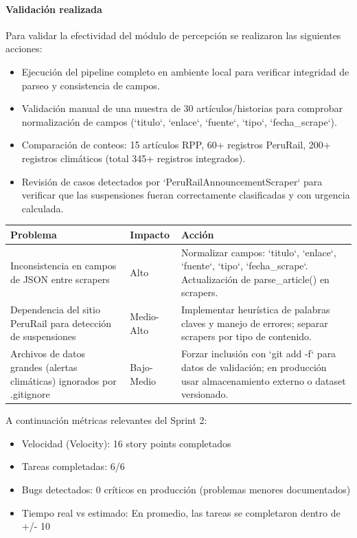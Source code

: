 \documentclass[12pt,a4paper]{article}
\newcommand{\sectiontitle}[1]{\vspace{0.6cm}\noindent{\fontsize{13}{15}\selectfont\textbf{#1}}\par\vspace{0.15cm}\noindent{\fontsize{12}{14}\selectfont}}
\newcommand{\bodytext}[1]{{\fontsize{12}{14}\selectfont #1}\par}
\begin{document}
\paragraph{Validación realizada}
\bodytext{Para validar la efectividad del módulo de percepción se realizaron las siguientes acciones:}
\begin{itemize}
  \item Ejecución del pipeline completo en ambiente local para verificar integridad de parseo y consistencia de campos.
  \item Validación manual de una muestra de 30 artículos/historias para comprobar normalización de campos (`titulo`, `enlace`, `fuente`, `tipo`, `fecha_scrape`).
  \item Comparación de conteos: 15 artículos RPP, 60+ registros PeruRail, 200+ registros climáticos (total 345+ registros integrados).
  \item Revisión de casos detectados por `PeruRailAnnouncementScraper` para verificar que las suspensiones fueran correctamente clasificadas y con urgencia calculada.
\end{itemize}

\sectiontitle{Incidencias y Riesgos}
\begin{longtable}{p{6cm} p{3.5cm} p{5cm}}
\toprule
\textbf{Problema} & \textbf{Impacto} & \textbf{Acción} \\
\midrule
Inconsistencia en campos de JSON entre scrapers & Alto & Normalizar campos: `titulo`, `enlace`, `fuente`, `tipo`, `fecha_scrape`. Actualización de parse_article() en scrapers. \\
Dependencia del sitio PeruRail para detección de suspensiones & Medio-Alto & Implementar heurística de palabras claves y manejo de errores; separar scrapers por tipo de contenido. \\
Archivos de datos grandes (alertas climáticas) ignorados por .gitignore & Bajo-Medio & Forzar inclusión con `git add -f` para datos de validación; en producción usar almacenamiento externo o dataset versionado. \\
\bottomrule
\end{longtable}

\sectiontitle{Métricas}
\bodytext{A continuación métricas relevantes del Sprint 2:}

\begin{itemize}
  \item Velocidad (Velocity): 16 story points completados
  \item Tareas completadas: 6/6
  \item Bugs detectados: 0 críticos en producción (problemas menores documentados)
  \item Tiempo real vs estimado: En promedio, las tareas se completaron dentro de +/- 10%
\end{itemize}
\end{document}
